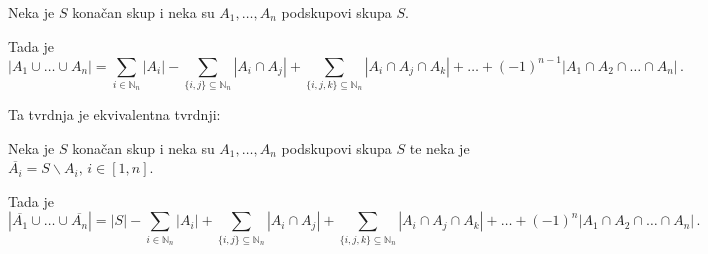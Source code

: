 \begin{theorem}
    Neka je $S$ konačan skup i neka su $A_1, \dots, A_n$ podskupovi skupa $S$.

    Tada je
    $$
        |A_1 \cup \dots \cup A_n| = \sum_{i\in\mathbb{N}_n} |A_i| - \sum_{\{i,j\}\subseteq\mathbb{N}_n} |A_i \cap A_j| + \sum_{\{i,j,k\}\subseteq\mathbb{N}_n}|A_i\cap A_j \cap A_k| + \dots + (-1)^{n-1} |A_1\cap A_2 \cap \dots \cap A_n|\,.
    $$
\end{theorem}

Ta tvrdnja je ekvivalentna tvrdnji:

\begin{corollary}
    Neka je $S$ konačan skup i neka su $A_1, \dots, A_n$ podskupovi skupa $S$ te neka je $\overline{A_i} = S \backslash A_i,\, i\in [1, n]$.

    Tada je
    $$
        |\overline{A_1} \cup \dots \cup \overline{A_n}| = |S| - \sum_{i\in\mathbb{N}_n} |A_i| + \sum_{\{i,j\}\subseteq\mathbb{N}_n} |A_i \cap A_j| + \sum_{\{i,j,k\}\subseteq\mathbb{N}_n}|A_i\cap A_j \cap A_k| + \dots + (-1)^{n} |A_1\cap A_2 \cap \dots \cap A_n|\,.
    $$
\end{corollary}
